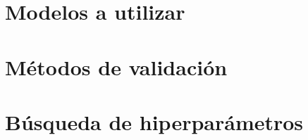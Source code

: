 \section{Modelos a utilizar}



\section{Métodos de validación}


\section{Búsqueda de hiperparámetros}
